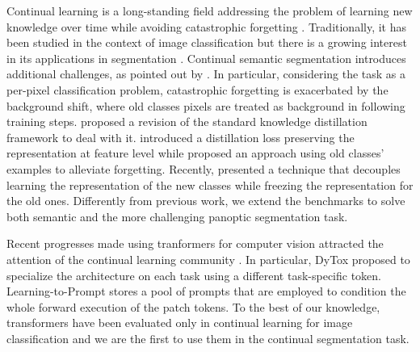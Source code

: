 \documentclass[10pt,twocolumn,letterpaper]{article}
\begin{document}
Continual learning is a long-standing field addressing the problem of learning new knowledge over time while avoiding catastrophic forgetting \cite{french1999catastrophicforgetting, thrun1998lifelonglearning, robins1995catastrophicforgetting}. Traditionally, it has been studied in the context of image classification \cite{rebuffi2017icarl, li2018lwf, kirkpatrick2017ewc, rusu2016progressive, douillard2020podnet, chaudhry2019AGEM, yan2021der, douillard2021dytox} but there is a growing interest in its applications in segmentation \cite{michieli2019ilt, cermelli2020modelingthebackground, cermelli2020fewshotcontinualsegm, douillard2020plop, cermelli2022incremental, douillard2021objectrehearsal, michieli2021continual, maracani2021recall, zhang2022rcil, cermelli2022modeling}. Continual semantic segmentation introduces additional challenges, as pointed out by \cite{cermelli2020modelingthebackground}. In particular, considering the task as a per-pixel classification problem, catastrophic forgetting is exacerbated by the background shift, where old classes pixels are treated as background in following training steps. \cite{cermelli2020modelingthebackground} proposed a revision of the standard knowledge distillation framework to deal with it. \cite{douillard2020podnet, michieli2019ilt} introduced a distillation loss preserving the representation at feature level while \cite{maracani2021recall} proposed an approach using old classes' examples to alleviate forgetting. Recently, \cite{zhang2022rcil} presented a technique that decouples learning the representation of the new classes while freezing the representation for the old ones. Differently from previous work, we extend the benchmarks to solve both semantic and the more challenging panoptic segmentation task. 

Recent progresses made using tranformers for computer vision \cite{dosovitskiy2020vit, touvron2021cait, touvron2021deit, liu2021swin} attracted the attention of the continual learning community \cite{douillard2021dytox, wang2022learning, wang2022dualprompt}. In particular, DyTox \cite{douillard2021dytox} proposed to specialize the architecture on each task using a different task-specific token. Learning-to-Prompt \cite{wang2022learning} stores a pool of prompts that are employed to condition the whole forward execution of the patch tokens. To the best of our knowledge, transformers have been evaluated only in continual learning for image classification \cite{douillard2021dytox, li2021continualtransformer} and we are the first to use them in the continual segmentation task.
 
\end{document}
